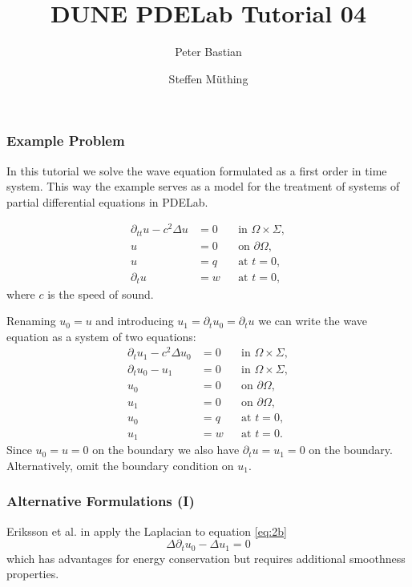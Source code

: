 \documentclass[aspectratio=169,11pt]{beamer}
\title{DUNE PDELab Tutorial 04}
\author{Peter Bastian \and Steffen Müthing}
\institute[]
{
  IWR\\
  Heidelberg University
}
\theoremstyle{definition}
\begin{document}



\begin{frame}
\frametitle{Example Problem}
 In this tutorial we solve the wave equation formulated as a first order
in time system. This way the example serves as a model for the
treatment of systems of partial differential equations in PDELab.

\begin{subequations}
\label{eq:WaveEquation}
\begin{align}
\partial_{tt} u-c^2\Delta u  &= 0 &&\text{in $\Omega\times\Sigma$},\\
u &= 0 &&\text{on $\partial\Omega$},\\
u &= q &&\text{at $t=0$},\\
\partial_t u &= w &&\text{at $t=0$},
\end{align}
\end{subequations}
where $c$ is the speed of sound.
\end{frame}
\begin{frame}
Renaming $u_0=u$ and introducing $u_1=\partial_t u_0 =\partial_t u$ we can write the wave equation as a system of two equations:
\begin{subequations}
\label{eq:SystemForm1}
\begin{align}
\partial_t u_1 - c^2\Delta u_0 &=0 &&\text{in $\Omega\times\Sigma$}, \label{eq:2a}\\
\partial_t u_0 - u_1 &=0 &&\text{in $\Omega\times\Sigma$}, \label{eq:2b}\\
u_0 &= 0 &&\text{on $\partial\Omega$},\\
u_1 &= 0 &&\text{on $\partial\Omega$},\\
u_0 &= q &&\text{at $t=0$},\\
u_1 &= w &&\text{at $t=0$}.
\end{align}
\end{subequations}
Since $u_0=u=0$ on the boundary we also have $\partial_t u = u_1 = 0$ on the boundary.
Alternatively, omit the boundary condition on $u_1$.
\end{frame}


\begin{frame}
\frametitle{Alternative Formulations (I)}
Eriksson et al. in \cite{Eriksson} apply the Laplacian to
equation \eqref{eq:2b}
\begin{equation}
\Delta \partial_t u_0 - \Delta u_1 = 0
\end{equation} \label{eq:Eriksson}
which has advantages for energy conservation but requires additional smoothness
properties.
\end{frame}
\end{document}
